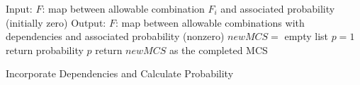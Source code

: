 \begin{algorithm}[H]
	Input: $F$: map between allowable combination $F_i$ and associated probability (initially zero) \;
	Output: $F$: map between allowable combinations with dependencies and associated probability (nonzero) \;
	$newMCS =$ empty list \;
	$p=1$ \;
	return probability $p$ \;
	return $newMCS$ as the completed MCS \;
	\caption{Incorporate Dependencies and Calculate Probability}
	\label{alg:repl_alg}
\end{algorithm}

































